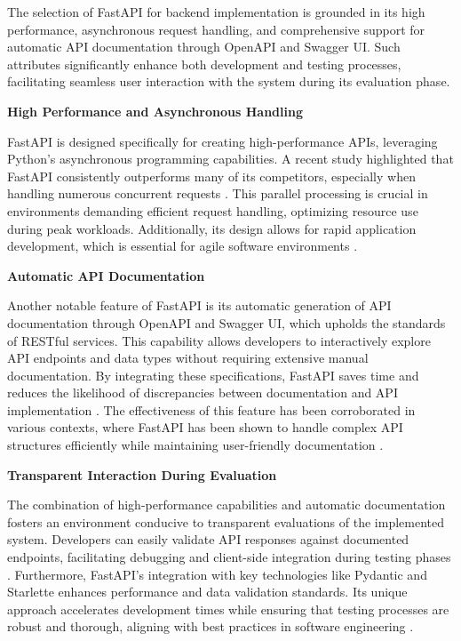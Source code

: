 The selection of FastAPI for backend implementation is grounded in its high performance, asynchronous request handling, and comprehensive support for automatic API documentation through OpenAPI and Swagger UI. Such attributes significantly enhance both development and testing processes, facilitating seamless user interaction with the system during its evaluation phase.

\textbf{High Performance and Asynchronous Handling}

FastAPI is designed specifically for creating high-performance APIs, leveraging Python's asynchronous programming capabilities. A recent study highlighted that FastAPI consistently outperforms many of its competitors, especially when handling numerous concurrent requests \cite{10.35784/jcsi.7738}. This parallel processing is crucial in environments demanding efficient request handling, optimizing resource use during peak workloads. Additionally, its design allows for rapid application development, which is essential for agile software environments \cite{10.1016/j.heliyon.2024.e40855}.

\textbf{Automatic API Documentation}

Another notable feature of FastAPI is its automatic generation of API documentation through OpenAPI and Swagger UI, which upholds the standards of RESTful services. This capability allows developers to interactively explore API endpoints and data types without requiring extensive manual documentation. By integrating these specifications, FastAPI saves time and reduces the likelihood of discrepancies between documentation and API implementation \cite{10.55041/ijsrem35726}. The effectiveness of this feature has been corroborated in various contexts, where FastAPI has been shown to handle complex API structures efficiently while maintaining user-friendly documentation \cite{10.25236/ajets.2023.061118}.

\textbf{Transparent Interaction During Evaluation}

The combination of high-performance capabilities and automatic documentation fosters an environment conducive to transparent evaluations of the implemented system. Developers can easily validate API responses against documented endpoints, facilitating debugging and client-side integration during testing phases \cite{10.31315/telematika.v21i1.13259}. Furthermore, FastAPI's integration with key technologies like Pydantic and Starlette enhances performance and data validation standards. Its unique approach accelerates development times while ensuring that testing processes are robust and thorough, aligning with best practices in software engineering \cite{10.55041/ijsrem35726}.

